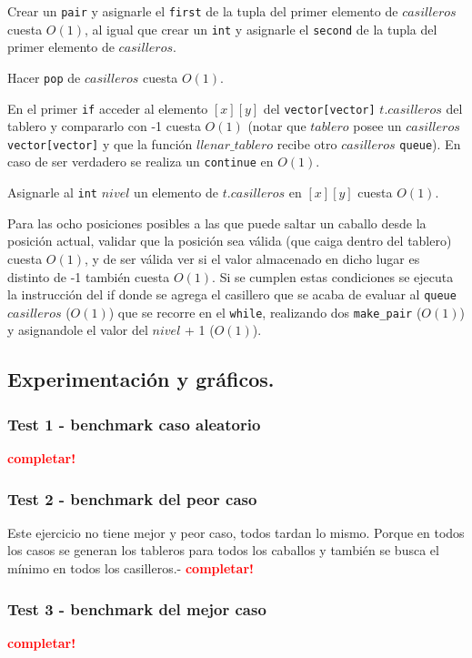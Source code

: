 \begin{enumerate}
 Crear un \verb|pair| y asignarle el \verb|first| de la tupla del primer elemento 
 de $casilleros$ cuesta $O(1)$, al igual que crear un \verb|int| y asignarle el
 \verb|second| de la tupla del primer elemento de $casilleros$.
 
 Hacer \verb|pop| de $casilleros$ cuesta $O(1)$.
 
 En el primer \verb|if| acceder al elemento $[x][y]$ del \verb|vector[vector]| 
 $t.casilleros$ del tablero y compararlo con -1 cuesta $O(1)$ (notar que $tablero$ 
 posee un $casilleros$ \verb|vector[vector]| y que la función $llenar\_tablero$ recibe otro $casilleros$ 
 \verb|queue|). En caso de ser verdadero se realiza un \verb|continue| en $O(1)$.
 
 Asignarle al \verb|int| $nivel$ un elemento de $t.casilleros$ en $[x][y]$ cuesta $O(1)$.
 
 Para las ocho posiciones posibles a las que puede saltar un caballo desde la posición
 actual, validar que la posición sea válida (que caiga dentro del tablero) cuesta 
 $O(1)$, y de ser válida ver si el valor almacenado en dicho lugar es distinto de -1
 también cuesta $O(1)$. Si se cumplen estas condiciones se ejecuta la instrucción 
 del if donde se agrega el casillero que se acaba de evaluar al \verb|queue| $casilleros$
 ($O(1)$) que se recorre en el \verb|while|, realizando dos \verb|make_pair| ($O(1)$) 
 y asignandole el valor del $nivel$ + 1 ($O(1)$).
 
\end{enumerate}

\newpage
\subsection{Experimentación y gráficos.}

\vspace*{0.3cm}

\subsubsection{Test 1 - benchmark caso aleatorio}

\textcolor{red}{\textbf{completar!}}


\newpage
\subsubsection{Test 2 - benchmark del peor caso}

Este ejercicio no tiene mejor y peor caso, todos tardan lo mismo.
Porque en todos los casos se generan los tableros para todos los caballos
y también se busca el mínimo en todos los casilleros.-
\textcolor{red}{\textbf{completar!}}


\newpage
\subsubsection{Test 3 - benchmark del mejor caso}

\textcolor{red}{\textbf{completar!}}
